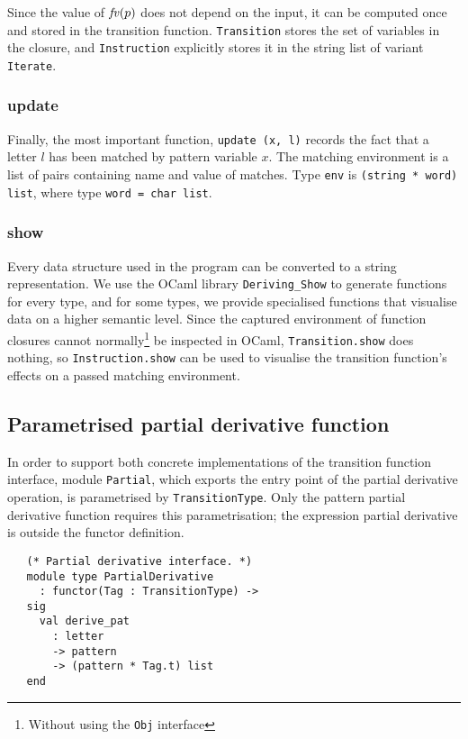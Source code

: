 Since the value of $\mathit{fv}(p)$ does not depend on the input, it can be computed
once and stored in the transition function. \texttt{Transition} stores the set
of variables in the closure, and \texttt{Instruction} explicitly stores it in
the string list of variant \texttt{Iterate}.


\subsubsection{update}

Finally, the most important function, \texttt{update (x, l)} records the fact
that a letter $l$ has been matched by pattern variable $x$. The matching
environment is a list of pairs containing name and value of matches. Type
\texttt{env} is \texttt{(string * word) list}, where type \texttt{word = char
list}.


\subsubsection{show}

Every data structure used in the program can be converted to a string
representation. We use the OCaml library \texttt{Deriving\_Show} to generate
functions for every type, and for some types, we provide specialised functions
that visualise data on a higher semantic level. Since the captured environment
of function closures cannot normally\footnote{Without using the \texttt{Obj}
interface} be inspected in OCaml, \texttt{Transition.show} does nothing, so
\texttt{Instruction.show} can be used to visualise the transition function's
effects on a passed matching environment.


\subsection{Parametrised partial derivative function}

In order to support both concrete implementations of the transition function
interface, module \texttt{Partial}, which exports the entry point of the partial
derivative operation, is parametrised by \texttt{TransitionType}. Only the
pattern partial derivative function requires this parametrisation; the
expression partial derivative is outside the functor definition.

\begin{lstlisting}
   (* Partial derivative interface. *)
   module type PartialDerivative
     : functor(Tag : TransitionType) ->
   sig
     val derive_pat
       : letter
       -> pattern
       -> (pattern * Tag.t) list
   end
\end{lstlisting}


